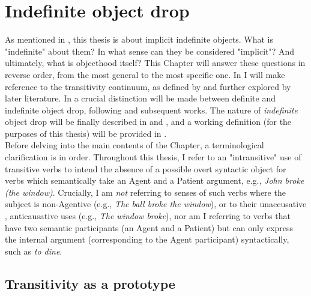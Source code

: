 \setchapterpreamble[u]{\margintoc}
\chapter{Indefinite object drop} %

As mentioned in , this thesis is about implicit indefinite objects. What is "indefinite" about them? In what sense can they be considered "implicit"? And ultimately, what is objecthood itself? This Chapter will answer these questions in reverse order, from the most general to the most specific one. In  I will make reference to the transitivity continuum, as defined by \textcite{HopperThompson1980} and further explored by later literature. In  a crucial distinction will be made between definite and indefinite object drop, following \textcite{Fillmore1986} and subsequent works. The nature of \textit{indefinite} object drop will be finally described in  and , and a working definition (for the purposes of this thesis) will be provided in .\\
Before delving into the main contents of the Chapter, a terminological clarification is in order. Throughout this thesis, I refer to an "intransitive" use of transitive verbs to intend the absence of a possible overt syntactic object for verbs which semantically take an Agent and a Patient argument, e.g., \textit{John broke (the window)}. Crucially, I am \textit{not} referring to senses of such verbs where the subject is non-Agentive (e.g., \textit{The ball broke the window}), or to their unaccusative \parencite{perlmutter1978impersonal}, anticausative uses (e.g., \textit{The window broke}), nor am I referring to verbs that have two semantic participants (an Agent and a Patient) but can only express the internal argument (corresponding to the Agent participant) syntactically, such as \textit{to dine}.


\section{Transitivity as a prototype} 

